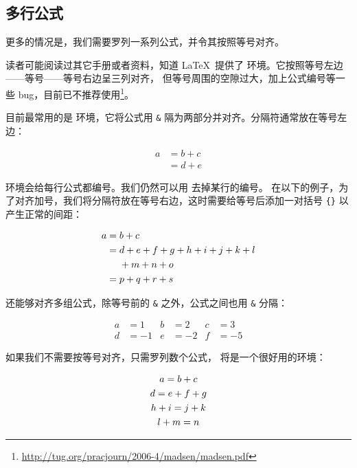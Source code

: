 \subsection{多行公式}\label{subsec:align}

更多的情况是，我们需要罗列一系列公式，并令其按照等号对齐。

读者可能阅读过其它手册或者资料，知道 \LaTeX\ 提供了  环境。它按照等号左边——等号——等号右边呈三列对齐，
但等号周围的空隙过大，加上公式编号等一些 bug，目前已不推荐使用\footnote{\url{http://tug.org/pracjourn/2006-4/madsen/madsen.pdf}}。

目前最常用的是  环境，它将公式用 \texttt\& 隔为两部分并对齐。分隔符通常放在等号左边：
\begin{example}
\begin{align}
a & = b + c \\
& = d + e
\end{align}
\end{example}

 环境会给每行公式都编号。我们仍然可以用  去掉某行的编号。
在以下的例子，为了对齐加号，我们将分隔符放在等号右边，这时需要给等号后添加一对括号 \texttt\{\texttt\} 以产生正常的间距：
\begin{example}
\begin{align}
a ={} & b + c \\
  ={} & d + e + f + g + h + i
        + j + k + l \notag \\
      & + m + n + o \\
  ={} & p + q + r + s
\end{align}
\end{example}

 还能够对齐多组公式，除等号前的 \texttt\& 之外，公式之间也用 \texttt\& 分隔：
\begin{example}
\begin{align}
a &=1 & b &=2 & c &=3 \\
d &=-1 & e &=-2 & f &=-5 
\end{align}
\end{example}

如果我们不需要按等号对齐，只需罗列数个公式， 将是一个很好用的环境：
\begin{example}
\begin{gather}
a = b + c \\
d = e + f + g \\
h + i = j + k \notag \\
l + m = n
\end{gather}
\end{example}

